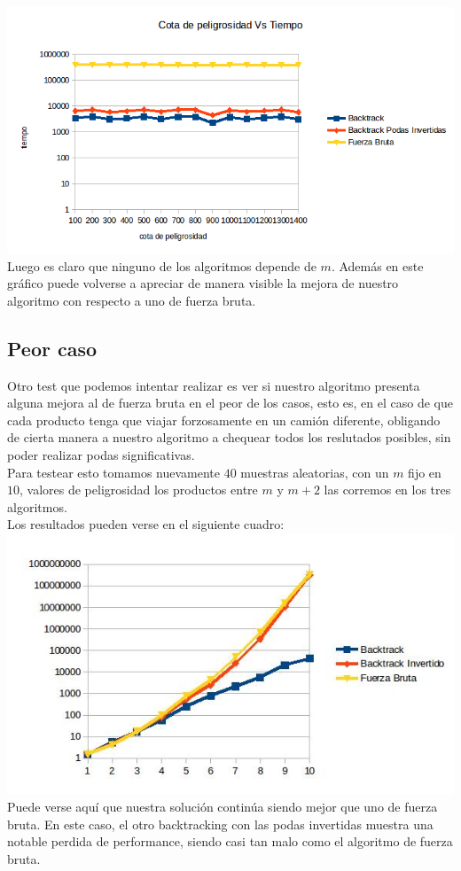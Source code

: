 \\
\includegraphics[width=18cm]{./Ej3/graph2.png}
\\
Luego es claro que ninguno de los algoritmos depende de $m$. Adem\'as en este gr\'afico puede volverse a apreciar de manera visible la mejora de nuestro algoritmo con respecto a uno de fuerza bruta.
\\
\subsection{Peor caso}
Otro test que podemos intentar realizar es ver si nuestro algoritmo presenta alguna mejora al de fuerza bruta en el peor de los casos, esto es, en el caso de que cada producto tenga que viajar forzosamente en un cami\'on diferente, obligando de cierta manera a nuestro algoritmo a chequear todos los reslutados posibles, sin poder realizar podas significativas.
\\
Para testear esto tomamos nuevamente $40$ muestras aleatorias, con un $m$ fijo en $10$, valores de peligrosidad los productos entre $m$ y $m+2$ las corremos en los tres algoritmos.
\\
Los resultados pueden verse en el siguiente cuadro:
\\
\includegraphics[width=18cm]{./Ej3/peorGraph.jpg}
\\
Puede verse aqu\'i que nuestra soluci\'on contin\'ua siendo mejor que uno de fuerza bruta. En este caso, el otro backtracking con las podas invertidas muestra una notable perdida de performance, siendo casi tan malo como el algoritmo de fuerza bruta.
